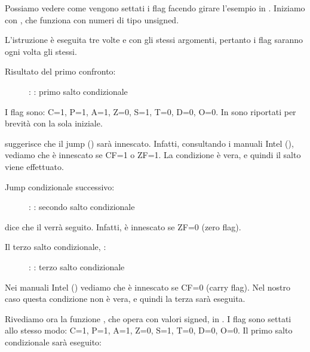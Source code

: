 \clearpage
{}
\myindex{\olly}

Possiamo vedere come vengono settati i flag facendo girare l'esempio in \olly.
Iniziamo con , che funziona con numeri di tipo unsigned.

L'istruzione \CMP è eseguita tre volte e con gli stessi argomenti, pertanto i flag saranno ogni volta gli stessi.

Risultato del primo confronto:

\begin{figure}[H]
\centering
{}
\caption{\olly: : primo salto condizionale}
\label{fig:jcc_olly_unsigned_1}
\end{figure}

I flag sono: C=1, P=1, A=1, Z=0, S=1, T=0, D=0, O=0.
In \olly sono riportati per brevità con la sola iniziale.


\olly suggerisce che il jump (\JBE) sarà innescato.
Infatti, consultando i manuali Intel (), vediamo che \JBE è innescato se CF=1 o ZF=1.
La condizione è vera, e quindi il salto viene effettuato.

\clearpage
Jump condizionale successivo:

\begin{figure}[H]
\centering
{}
\caption{\olly: : secondo salto condizionale}
\label{fig:jcc_olly_unsigned_2}
\end{figure}

\olly dice che il \JNZ verrà seguito.
Infatti, \JNZ è innescato se ZF=0 (zero flag).

\clearpage
Il terzo salto condizionale, \JNB:

\begin{figure}[H]
\centering
{}
\caption{\olly: : terzo salto condizionale}
\label{fig:jcc_olly_unsigned_3}
\end{figure}

Nei manuali Intel () vediamo che \JNB è innescato se CF=0 (carry flag).
Nel nostro caso questa condizione non è vera, e quindi la terza \printf sarà eseguita.

\clearpage
Rivediamo ora la funzione , che opera con valori signed, in \olly.
I flag sono settati allo stesso modo: C=1, P=1, A=1, Z=0, S=1, T=0, D=0, O=0.
Il primo salto condizionale \JLE sarà eseguito:

